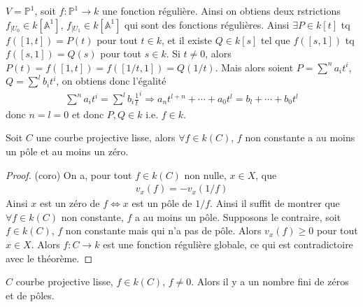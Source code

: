             \begin{expl}
                $V = \mathbb{P}^1$, soit $f : \mathbb{P}^1 \to k$ une fonction régulière. Ainsi on obtiens deux rstrictions $f_{|U_0} \in k[\mathbb{A}^1]$, $f_{|U_1} \in k[\mathbb{A}^1]$ qui sont des fonctions régulières. Ainsi $\exists P \in k[t]$ tq $f([1,t]) = P(t)$ pour tout $t \in k$, et il existe $Q \in k[s]$ tel que $f([s,1])$ tq $f([s,1]) = Q(s)$ pour tout $s \in k$. Si $t \neq 0$, alors $P(t) = f([1,t]) = f([1/t, 1]) = Q(1/t)$. Mais alors soient $P = \sum^n a_it^i$, $Q = \sum^l b_it^i$, on obtiens donc l'égalité
                \begin{align*}
                    \sum^n a_it^i = \sum^l b_i\frac1t^i
                    \Rightarrow a_n t^{l + n} + \cdots + a_0t^l = b_l + \cdots + b_0t^l
                \end{align*}
                donc $n = l = 0$ et donc $P,Q \in k$ i.e. $f \in k$.
            \end{expl}
            \begin{coro}
                Soit $C$ une courbe projective lisse, alors $\forall f \in k(C)$, $f$ non constante a au moins un pôle et au moins un zéro.
            \end{coro}
            \begin{proof} (coro)
                On a, pour tout $f \in k(C)$ non nulle, $x \in X$, que 
                \begin{align*}
                    v_x(f) = - v_x(1/f)
                \end{align*}
                Ainsi $x$ est un zéro de $f \iff x$ est un pôle de $1/f$. Ainsi il suffit de montrer que $\forall f \in k(C)$ non constante, $f$ a au moins un pôle. Supposons le contraire, soit $f \in k(C)$, $f$ non constante mais qui n'a pas de pôle. Alors $v_x(f) \geq 0$ pour tout $x \in X$. Alors $f : C \to k$ est une fonction régulière globale,  ce qui est contradictoire avec le théorème. 
            \end{proof}
            \begin{prop}
                $C$ courbe projective lisse, $f \in k(C)$, $f \neq 0$. Alors il y a un nombre fini de zéros et de pôles.
            \end{prop}
